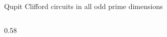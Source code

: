 \begin{frame}{Qupit Clifford circuits in all odd prime dimensions \New}
\begin{columns}[c]
\begin{column}{0.58\textwidth}
\begin{code}
\AgdaSpace{}%
\AgdaOperator{\AgdaDatatype{===}}\AgdaSpace{}%
\AgdaSpace{}%
\AgdaSpace{}%
\AgdaSpace{}%
\<%
\\
%
\>[2]\AgdaSpace{}%
\AgdaSymbol{:}%
\>[18]\AgdaSymbol{(}\AgdaSpace{}%
\AgdaSymbol{)}\AgdaSpace{}%
%
\>[32]\AgdaSpace{}%
\AgdaSpace{}%
\AgdaSpace{}%
\AgdaSpace{}%
\AgdaOperator{\AgdaDatatype{===}}\AgdaSpace{}%
\AgdaSpace{}%
\AgdaSpace{}%
\AgdaSpace{}%
\<%
\\
%
\>[2]\AgdaSpace{}%
\AgdaSymbol{:}%
\>[18]\AgdaSymbol{(}\AgdaSpace{}%
\AgdaSymbol{)}\AgdaSpace{}%
%
\>[32]\AgdaSpace{}%
\AgdaSpace{}%
\AgdaSpace{}%
\AgdaSpace{}%
\AgdaOperator{\AgdaDatatype{===}}\AgdaSpace{}%
\AgdaSpace{}%
\AgdaSpace{}%
\AgdaSpace{}%
\<%
\\
%
\>[2]\AgdaSpace{}%
\AgdaSymbol{:}%
\>[18]\AgdaSymbol{(}\AgdaSpace{}%
\AgdaSymbol{)}\AgdaSpace{}%
%
\>[32]\AgdaSymbol{(}\AgdaSpace{}%
\AgdaOperator{\AgdaPostulate{\textasciicircum{}}}\AgdaSpace{}%
\AgdaSymbol{)}\AgdaSpace{}%
\AgdaSpace{}%
\AgdaSpace{}%
\AgdaSymbol{(}\AgdaSpace{}%
\AgdaOperator{\AgdaPostulate{\textasciicircum{}}}\AgdaSpace{}%
\AgdaSymbol{)}\AgdaSpace{}%
\AgdaSpace{}%
\AgdaSpace{}%
\AgdaSpace{}%
\AgdaOperator{\AgdaPostulate{\textasciicircum{}}}\AgdaSpace{}%
\AgdaSpace{}%
\AgdaSpace{}%
\AgdaSpace{}%
\AgdaSpace{}%
\AgdaSpace{}%

\end{code}
\end{column}
\end{columns}
\end{frame}
